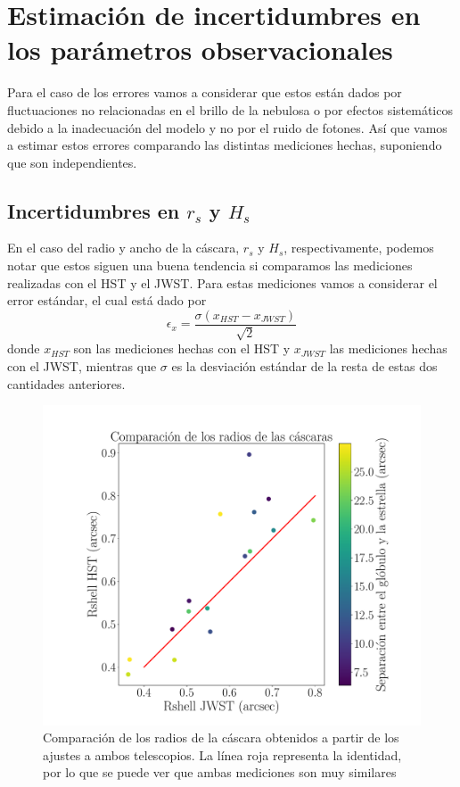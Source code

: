 \documentclass{book}
\begin{document}
\section[Errores observacionales]{Estimación de incertidumbres en los parámetros observacionales}

Para el caso de los errores vamos a considerar que estos están dados por fluctuaciones no relacionadas en el brillo de la nebulosa o por efectos  sistemáticos debido a la inadecuación del modelo y no por el ruido de fotones. Así que vamos a estimar estos errores comparando las distintas mediciones hechas, suponiendo que son independientes.

\subsection{\boldmath Incertidumbres en $r_s$ y $H_s$}

En el caso del radio y ancho de la cáscara, $r_s$ y $H_s$, respectivamente, podemos notar que estos siguen una buena tendencia si comparamos las mediciones realizadas con el HST y el JWST. Para estas mediciones vamos a considerar el error estándar, el cual está dado por
\begin{equation}
\epsilon_x = \frac{\sigma(x_{HST}-x_{JWST})}{\sqrt{2}}     
\end{equation}
donde $x_{HST}$ son las mediciones hechas con el HST y $x_{JWST}$ las mediciones hechas con el JWST, mientras que $\sigma$ es la desviación estándar de la resta de estas dos cantidades anteriores. 

\begin{figure}[htb]
    \centering
    \includegraphics[width=\textwidth]{Nuevas imagenes finales/R_shell_r.pdf}
    \caption{Comparación de los radios de la cáscara obtenidos a partir de los ajustes a ambos telescopios. La línea roja representa la identidad, por lo que se puede ver que ambas mediciones son muy similares}
    \label{fgi: Radios de la cascara}
\end{figure}
\end{document}
